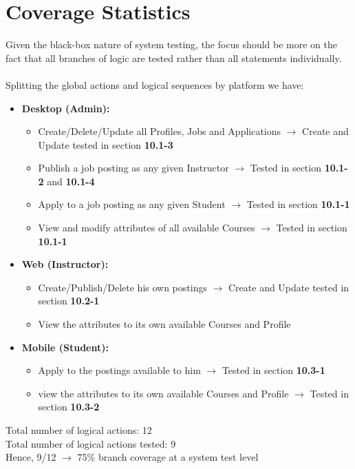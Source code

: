 \documentclass[12pt]{report}
\begin{document}
\section{Coverage Statistics}
Given the black-box nature of system testing, the focus should be more on the fact
that all branches of logic are tested rather than all statements individually.\\\\
Splitting the global actions and logical sequences by platform we have:
\begin{itemize}
    \item \textbf{Desktop (Admin):}
    \begin{itemize}
        \item Create/Delete/Update all Profiles, Jobs and Applications $\rightarrow$ Create and Update tested in section \textbf{10.1-3}
        \item Publish a job posting as any given Instructor $\rightarrow$ Tested in section \textbf{10.1-2} and \textbf{10.1-4}
        \item Apply to a job posting as any given Student $\rightarrow$ Tested in section \textbf{10.1-1} 
        \item View and modify attributes of all available Courses $\rightarrow$ Tested in section \textbf{10.1-1}
    \end{itemize}
    \item \textbf{Web (Instructor):}
        \begin{itemize}
        \item Create/Publish/Delete his own postings $\rightarrow$ Create and Update tested in section \textbf{10.2-1}
        \item View the attributes to its own available Courses and Profile
    \end{itemize}
    \item \textbf{Mobile (Student):}
        \begin{itemize}
        \item Apply to the postings available to him $\rightarrow$ Tested in section \textbf{10.3-1}
        \item view the attributes to its own available Courses and Profile $\rightarrow$ Tested in section \textbf{10.3-2}
    \end{itemize}
\end{itemize}
Total number of logical actions: 12\\
Total number of logical actions tested: 9\\
Hence, 9/12 $\rightarrow$ 75\% branch coverage at a system test level
\end{document}

